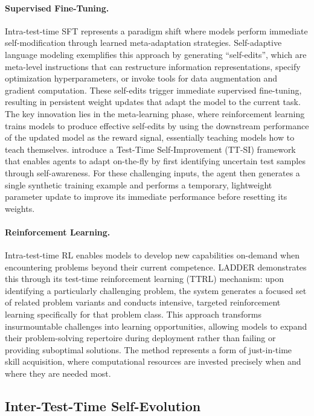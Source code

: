 \documentclass[10pt]{article} %
\begin{document}
\paragraph{Supervised Fine-Tuning.} Intra-test-time SFT represents a paradigm shift where models perform immediate self-modification through learned meta-adaptation strategies. Self-adaptive language modeling \citep{zweiger2025self} exemplifies this approach by generating ``self-edits'', which are meta-level instructions that can restructure information representations, specify optimization hyperparameters, or invoke tools for data augmentation and gradient computation. These self-edits trigger immediate supervised fine-tuning, resulting in persistent weight updates that adapt the model to the current task. The key innovation lies in the meta-learning phase, where reinforcement learning trains models to produce effective self-edits by using the downstream performance of the updated model as the reward signal, essentially teaching models how to teach themselves. \citet{acikgoz2025self} introduce a Test-Time Self-Improvement (TT-SI) framework that enables agents to adapt on-the-fly by first identifying uncertain test samples through self-awareness. For these challenging inputs, the agent then generates a single synthetic training example and performs a temporary, lightweight parameter update to improve its immediate performance before resetting its weights.


\paragraph{Reinforcement Learning.} Intra-test-time RL enables models to develop new capabilities on-demand when encountering problems beyond their current competence. LADDER \citep{simonds2025ladder} demonstrates this through its test-time reinforcement learning (TTRL) mechanism: upon identifying a particularly challenging problem, the system generates a focused set of related problem variants and conducts intensive, targeted reinforcement learning specifically for that problem class. This approach transforms insurmountable challenges into learning opportunities, allowing models to expand their problem-solving repertoire during deployment rather than failing or providing suboptimal solutions. The method represents a form of just-in-time skill acquisition, where computational resources are invested precisely when and where they are needed most.


\subsection{Inter-Test-Time Self-Evolution}
\end{document}
